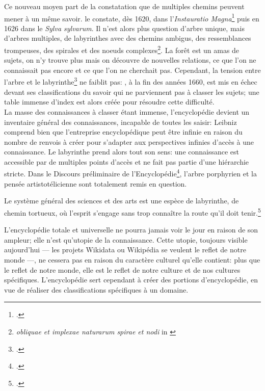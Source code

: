 Ce nouveau moyen part de la constatation que de multiples chemins peuvent mener à un même savoir.  le constate, dès 1620, dans l'\textit{Instauratio Magna}\footcite{bacon_instauratio_1620} puis en 1626 dans le \textit{Sylva sylvarum}. Il n'est alors plus question d'arbre unique, mais d'arbres multiples, de labyrinthes avec des chemins ambigus, des ressemblances trompeuses, des spirales et des noeuds complexes\footnote{\og \textit{obliquae et implexae naturarum spirae et nodi}\fg{} in \cite{bacon_instauratio_1620}}. La forêt est un amas de sujets, on n'y trouve plus mais on découvre de nouvelles relations, ce que l'on ne connaissait pas encore et ce que l'on ne cherchait pas. Cependant, la \og tension entre l'arbre et le labyrinthe\fg{}\footcite{eco_arbre_2010} ne faiblit pas: , à la fin des années 1660, est mis en échec devant ses classifications du savoir qui ne parviennent pas à classer les sujets; une table immense d'index est alors créée pour résoudre cette difficulté.\\

La masse des connaissances à classer étant immense, l'encyclopédie devient un inventaire général des connaissances, incapable de toutes les saisir: Leibniz comprend bien que l'entreprise encyclopédique peut être infinie en raison du nombre de renvois à créer pour s'adapter aux perspectives infinies d'accès à une connaissance. Le labyrinthe prend alors tout son sens: une connaissance est accessible par de multiples points d'accès et ne fait pas partie d'une hiérarchie stricte. Dans le \og Discours préliminaire\fg{} de l'Encyclopédie\footcite{diderot_encyclope_1751}, l'arbre porphyrien et la pensée artistotélicienne sont totalement remis en question. 
\begin{citationLongue}
	Le système général des sciences et des arts est une espèce de labyrinthe, de chemin tortueux, où l'esprit s'engage sans trop connaître la route qu'il doit tenir.\footcite[Discours préliminaire]{diderot_encyclope_1751}
\end{citationLongue}
L'encyclopédie totale et universelle ne pourra jamais voir le jour en raison de son ampleur; elle n'est qu'utopie de la connaissance. Cette utopie, toujours visible aujourd'hui --- les projets Wikidata ou Wikipédia se veulent le reflet de notre monde ---, ne cessera pas en raison du caractère culturel qu'elle contient: plus que le reflet de notre monde, elle est le reflet de notre culture et de nos cultures spécifiques. L'encyclopédie sert cependant à créer des portions d'encyclopédie, en vue de réaliser des classifications spécifiques à un domaine.

